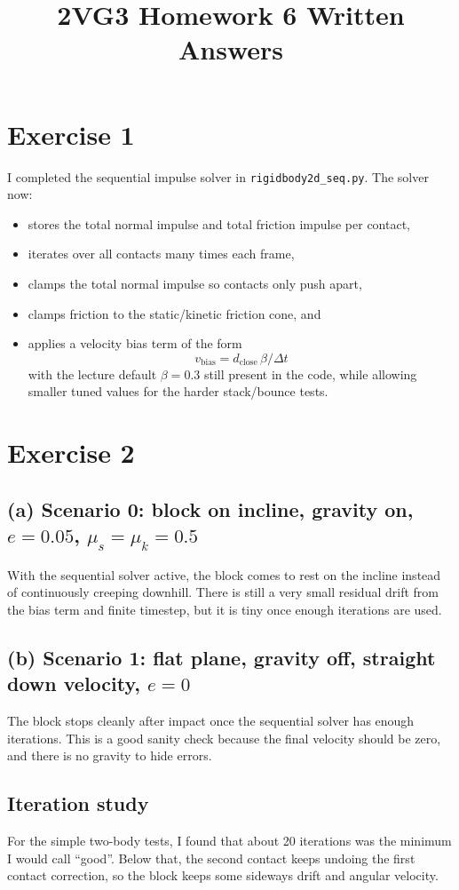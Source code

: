 \documentclass[11pt]{article}
\title{2VG3 Homework 6 Written Answers}
\author{}
\date{}
\begin{document}
\maketitle

\section*{Exercise 1}
I completed the sequential impulse solver in \texttt{rigidbody2d\_seq.py}. The solver now:
\begin{itemize}
    \item stores the total normal impulse and total friction impulse per contact,
    \item iterates over all contacts many times each frame,
    \item clamps the total normal impulse so contacts only push apart,
    \item clamps friction to the static/kinetic friction cone, and
    \item applies a velocity bias term of the form
    \[
    v_{\text{bias}} = d_{\text{close}} \, \beta / \Delta t
    \]
    with the lecture default $\beta = 0.3$ still present in the code, while allowing smaller tuned values for the harder stack/bounce tests.
\end{itemize}

\section*{Exercise 2}
\subsection*{(a) Scenario 0: block on incline, gravity on, $e=0.05$, $\mu_s=\mu_k=0.5$}
With the sequential solver active, the block comes to rest on the incline instead of continuously creeping downhill. There is still a very small residual drift from the bias term and finite timestep, but it is tiny once enough iterations are used.

\subsection*{(b) Scenario 1: flat plane, gravity off, straight down velocity, $e=0$}
The block stops cleanly after impact once the sequential solver has enough iterations. This is a good sanity check because the final velocity should be zero, and there is no gravity to hide errors.

\subsection*{Iteration study}
For the simple two-body tests, I found that about 20 iterations was the minimum I would call ``good''. Below that, the second contact keeps undoing the first contact correction, so the block keeps some sideways drift and angular velocity.
\end{document}

